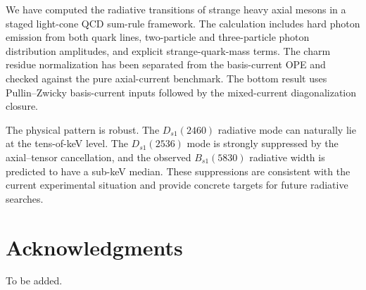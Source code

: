 \documentclass[11pt]{article}
\newcommand{\Dsone}{D_{s1}}
\newcommand{\Bsone}{B_{s1}}
\begin{document}
We have computed the radiative transitions of strange heavy axial mesons in a
staged light-cone QCD sum-rule framework.  The calculation includes hard photon
emission from both quark lines, two-particle and three-particle photon
distribution amplitudes, and explicit strange-quark-mass terms.  The charm
residue normalization has been separated from the basis-current OPE and checked
against the pure axial-current benchmark.  The bottom result uses
Pullin--Zwicky basis-current inputs followed by the mixed-current
diagonalization closure.

The physical pattern is robust.  The $\Dsone(2460)$ radiative mode can naturally
lie at the tens-of-keV level.  The $\Dsone(2536)$ mode is strongly suppressed by
the axial--tensor cancellation, and the observed $\Bsone(5830)$ radiative width
is predicted to have a sub-keV median.  These suppressions are consistent with
the current experimental situation and provide concrete targets for future
radiative searches.

\section*{Acknowledgments}

To be added.



\end{document}
